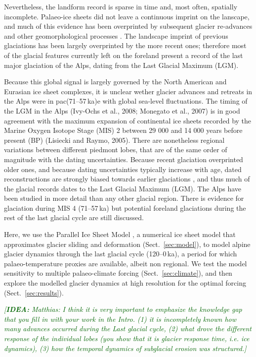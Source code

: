\documentclass[tc, manuscript]{copernicus}
\newcommand{\idea}[1]{\textcolor{darkgreen}{\emph{[\textbf{IDEA:} #1]}}}
\begin{document}
    Nevertheless, the landform record is sparse in time and, most often,
    spatially incomplete. Palaeo-ice sheets did not leave a continuous imprint
    on the lanscape, and much of this evidence has been overprinted by
    subsequent glacier re-advances and other geomorphological processes
    \citep{Kleman.1994, Kleman.etal.2006, Kleman.etal.2010}. The landscape
    imprint of previous glaciations has been largely overprinted by the more
    recent ones; therefore most of the glacial features currently left on the
    foreland present a record of the last major glaciation of the Alps, dating
    from the Last Glacial Maximum (LGM).

    Because this global signal is largely governed by the North American and
    Eurasian ice sheet complexes, it is unclear wether glacier advances and
    retreats in the Alps were in pac(71--57\,ka)e with global sea-level
    fluctuations. The timing of the LGM in the Alps (Ivy-Ochs et al., 2008;
    Monegato et al., 2007) is in good agreement with the maximum expansion of
    continental ice sheets recorded by the Marine Oxygen Isotope Stage (MIS) 2
    between 29 000 and 14 000 years before present (BP) (Lisiecki and Raymo,
    2005). There are nonetheless regional variations between different piedmont
    lobes, that are of the same order of magnitude with the dating
    uncertainties. Because recent glaciation overprinted older ones, and
    because dating uncertainties typically increase with age, dated
    reconstructions are strongly biased towards earlier glaciations
    \citep{Heyman.etal.2011}, and thus much of the glacial records dates to the
    Last Glacial Maximum (LGM). The Alps have been studied in more detail than
    any other glacial region. There is evidence for glaciation during MIS 4
    (71--57\,ka) but potential foreland glaciations during the rest of the last
    glacial cycle are still discussed.

    Here, we use the Parallel Ice Sheet Model
    \citep[PISM,][]{PISM-authors.2017}, a numerical ice sheet model that
    approximates glacier sliding and deformation (Sect.~\ref{sec:model}), to
    model alpine glacier dynamics through the last glacial cycle (120--0\,ka),
    a period for which palaeo-temperature proxies are available, albeit non
    regional. We test the model sensitivity to multiple palaeo-climate forcing
    (Sect.~\ref{sec:climate}), and then explore the modelled glacier dynamics
    at high resolution for the optimal forcing (Sect.~\ref{sec:results}).

    \idea{Matthias: I think it is very important to emphasize the knowledge gap
          that you fill in with your work in the Intro. (1) it is incompletely
          known how many advances occurred during the Last glacial cycle, (2)
          what drove the different response of the individual lobes (you show
          that it is glacier response time, i.e. ice dynamics), (3) how the
          temporal dynamics of subglacial erosion was structured.}
\end{document}
